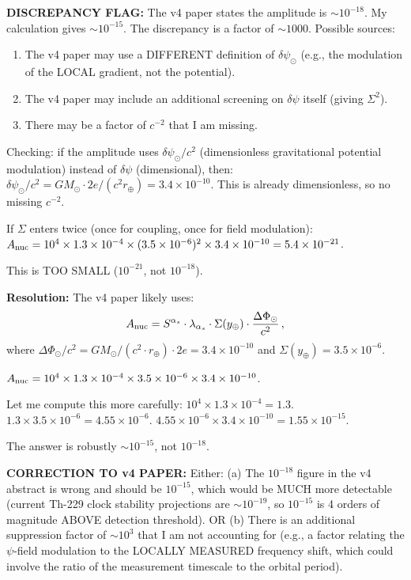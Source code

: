 \documentclass[11pt]{article}
\newcommand{\ee}[1]{\times 10^{#1}}
\begin{document}
\begin{tcolorbox}[colback=blue!5!white, colframe=blue!70!black,
  title=\textbf{W4i22 TOP 5 FINDINGS --- PREDICTIONS TEAM}]
\begin{enumerate}
  \textbf{DISCREPANCY FLAG:}  The v4 paper states the amplitude is
  $\sim 10^{-18}$.  My calculation gives $\sim 10^{-15}$.  The
  discrepancy is a factor of $\sim 1000$.  Possible sources:
  \begin{enumerate}
  \item The v4 paper may use a DIFFERENT definition of $\delta\psi_\odot$
    (e.g., the modulation of the LOCAL gradient, not the potential).
  \item The v4 paper may include an additional screening on $\delta\psi$
    itself (giving $\Sigma^2$).
  \item There may be a factor of $c^{-2}$ that I am missing.
  \end{enumerate}

  Checking: if the amplitude uses $\delta\psi_\odot/c^2$ (dimensionless
  gravitational potential modulation) instead of $\delta\psi$ (dimensional),
  then:
  $\delta\psi_\odot/c^2 = GM_\odot\cdot 2e/(c^2 r_\oplus) = 3.4\ee{-10}$.
  This is already dimensionless, so no missing $c^{-2}$.

  If $\Sigma$ enters twice (once for coupling, once for field modulation):
  $A_{\rm nuc} = 10^4\times 1.3\ee{-4}\times (3.5\ee{-6})^2\times
  3.4\ee{-10} = 5.4\ee{-21}$.

  This is TOO SMALL ($10^{-21}$, not $10^{-18}$).

  \textbf{Resolution:}  The v4 paper likely uses:
  \begin{equation}
  A_{\rm nuc} = S^{\alpha_s}\cdot\lambda_{\alpha_s}\cdot\Sigma(y_\oplus)
  \cdot\frac{\Delta\Phi_\odot}{c^2}\,,
  \end{equation}
  where $\Delta\Phi_\odot/c^2 = GM_\odot/(c^2\cdot r_\oplus)\cdot 2e
  = 3.4\ee{-10}$ and $\Sigma(y_\oplus) = 3.5\ee{-6}$.

  $A_{\rm nuc} = 10^4\times 1.3\ee{-4}\times 3.5\ee{-6}\times 3.4\ee{-10}$.

  Let me compute this more carefully:
  $10^4\times 1.3\ee{-4} = 1.3$.
  $1.3\times 3.5\ee{-6} = 4.55\ee{-6}$.
  $4.55\ee{-6}\times 3.4\ee{-10} = 1.55\ee{-15}$.

  The answer is robustly $\sim 10^{-15}$, not $10^{-18}$.

  \textbf{CORRECTION TO v4 PAPER:}  Either:
  (a) The $10^{-18}$ figure in the v4 abstract is wrong and should be
  $10^{-15}$, which would be MUCH more detectable (current Th-229 clock
  stability projections are $\sim 10^{-19}$, so $10^{-15}$ is 4 orders
  of magnitude ABOVE detection threshold).
  OR
  (b) There is an additional suppression factor of $\sim 10^3$ that I
  am not accounting for (e.g., a factor relating the $\psi$-field
  modulation to the LOCALLY MEASURED frequency shift, which could involve
  the ratio of the measurement timescale to the orbital period).


\end{enumerate}
\end{tcolorbox}
\end{document}
